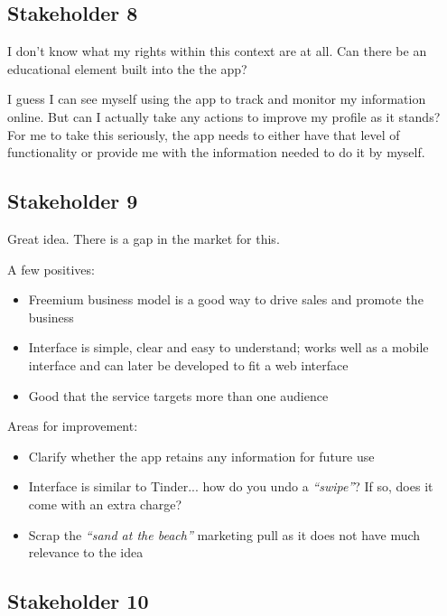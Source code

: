   \subsection{Stakeholder 8}
	
	I don't know what my rights within this context are at all. Can there be an educational element built into the the app? 
	
	I guess I can see myself using the app to track and monitor my information online. But can I actually take any actions to improve my profile as it stands? For me to take this seriously, the app needs to either have that level of functionality or provide me with the information needed to do it by myself.
	
	\subsection{Stakeholder 9}
	
	Great idea. There is a gap in the market for this.
	
	A few positives:
      \begin{itemize}
        \item Freemium business model is a good way to drive sales and promote the business
        \item Interface is simple, clear and easy to understand; works well as a mobile interface and can later be developed to fit a web interface
        \item Good that the service targets more than one audience
      \end{itemize}
	
	Areas for improvement:
      \begin{itemize}
        \item Clarify whether the app retains any information for future use
        \item Interface is similar to Tinder... how do you undo a \emph{``swipe''}? If so, does it come with an extra charge?
        \item Scrap the \emph{``sand at the beach''} marketing pull as it does not have much relevance to the idea
      \end{itemize}
		
		\subsection{Stakeholder 10}
	
